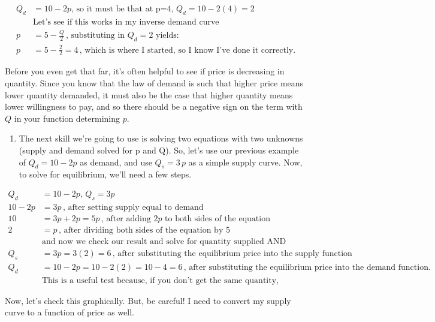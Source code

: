 \documentclass[11pt,]{article}
\providecommand{\tightlist}{%
  \setlength{\itemsep}{0pt}\setlength{\parskip}{0pt}}
\begin{document}
\begin{align*}
  Q_d&=10-2p,\,\text{so it must be that at p=4, }Q_d=10-2(4)=2\\
  &\text{Let's see if this works in my inverse demand curve}\\
  p&=5-\frac{Q}{2}\,\text{, substituting in $Q_d=2$ yields:}\\
  p&=5-\frac{2}{2}=4\,\text{, which is where I started, so I know I've done it correctly.}
\end{align*}

Before you even get that far, it's often helpful to see if price is
decreasing in quantity. Since you know that the law of demand is such
that higher price means lower quantity demanded, it must also be the
case that higher quantity means lower willingness to pay, and so there
should be a negative sign on the term with \(Q\) in your function
determining \(p\).

\begin{enumerate}
\def\labelenumi{\arabic{enumi}.}
\setcounter{enumi}{1}
\tightlist
\item
  The next skill we're going to use is solving two equations with two
  unknowns (supply and demand solved for p and Q). So, let's use our
  previous example of \(Q_d=10-2p\) as demand, and use \(Q_s=3\,p\) as a
  simple supply curve. Now, to solve for equilibrium, we'll need a few
  steps.
\end{enumerate}

\begin{align*}
  Q_d&=10-2p,\,Q_s=3p\\
  10-2p&=3p\,\text{, after setting supply equal to demand}\\
  10&=3p+2p=5p\,\text{, after adding $2p$ to both sides of the equation}\\
  2&=p\,\text{, after dividing both sides of the equation by 5}\\
  &\text{and now we check our result and solve for quantity supplied AND demanded:}\\
  Q_s&=3p=3(2)=6\,\text{, after substituting the equilibrium price into the supply function}\\
  Q_d&=10-2p=10-2(2)=10-4=6\,\text{, after substituting the equilibrium price into the demand function.}\\
  &\text{This is a useful test because, if you don't get the same quantity, you've done it incorrectly.}
\end{align*}

Now, let's check this graphically. But, be careful! I need to convert my
supply curve to a function of price as well.
\end{document}
